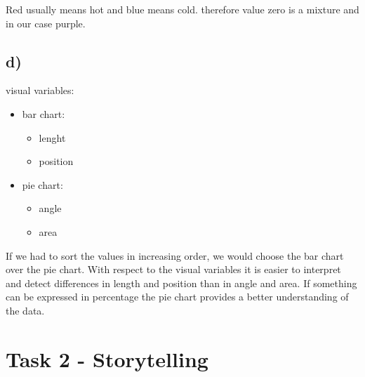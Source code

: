 \documentclass[a4paper]{article}
\begin{document}
\begin{itemize}
\begin{figure}[!h]
		\end{figure}
		Red usually means hot and blue means cold. therefore value zero is a mixture and in our case purple.
		
	\end{itemize}
	\subsection*{d)}
	
	visual variables:
	\begin{itemize}
		\item bar chart:
		\begin{itemize}
			\item lenght
			\item position
		\end{itemize}
		\item pie chart:
		\begin{itemize}
			\item angle
			\item area
		\end{itemize}
	\end{itemize}
	If we had to sort the values in increasing order, we would choose the bar chart over
	the pie chart. With respect to the visual variables it is easier to interpret and detect differences in length and position than in angle and area. If something can be expressed in percentage the pie chart provides a better understanding of the data.
	
	\section*{Task 2 - Storytelling}
	
\end{document}
